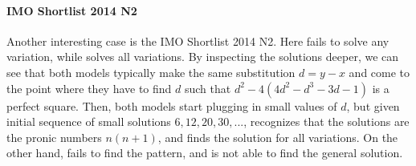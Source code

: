 \clearpage
\paragraph{IMO Shortlist 2014 N2}

Another interesting case is the IMO Shortlist 2014 N2. 
Here \geminithink{} fails to solve any variation, while \oone{} solves all variations.
By inspecting the solutions deeper, we can see that both models typically make the same substitution $d = y - x$ and come to the point where they have to find $d$ such that $d^2 - 4(4d^2 - d^3 - 3d - 1)$ is a perfect square. Then, both models start plugging in small values of $d$, but given initial sequence of small solutions $6, 12, 20, 30, ...$, \oone{} recognizes that the solutions are the pronic numbers $n(n+1)$, and finds the solution for all variations. On the other hand, \geminithink{} fails to find the pattern, and is not able to find the general solution.



